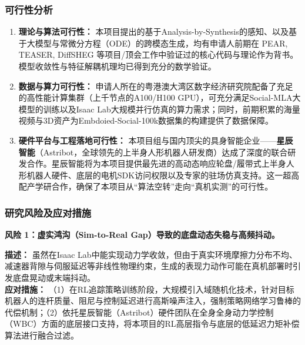 \subsubsection{可行性分析}

\begin{enumerate}
  \item \textbf{理论与算法可行性：} 本项目提出的基于Analysis-by-Synthesis的感知、以及基于大模型与常微分方程（ODE）的跨模态生成，均有申请人前期在 PEAR, TEASER, DiffSHEG 等项目/顶会工作中验证过的核心代码与理论作为背书。模型收敛性与特征解耦机理均已得到充分的数学验证。
  \item \textbf{数据与算力可行性：} 申请人所在的粤港澳大湾区数字经济研究院配备了充足的高性能计算集群（上千节点的A100/H100 GPU），可充分满足Social-MLA大模型的训练以及Isaac Lab大规模并行仿真的算力需求；同时，前期积累的海量视频与3D资产为Embdoied-Social-100k数据集的构建提供了数据保障。
  \item \textbf{硬件平台与工程落地可行性：} 本项目组与国内顶尖的具身智能企业——\textbf{星辰智能}（Astribot，全球领先的上半身人形机器人研发商）达成了深度的联合研发合作。星辰智能将为本项目提供最先进的高动态响应轮盘/履带式上半身人形机器人硬件、底层的电机SDK访问权限以及专家的驻场仿真支持。这一超高配产学研合作，确保了本项目从“算法空转”走向“真机实测”的可行性。
\end{enumerate}

\subsubsection{研究风险及应对措施}

{\textbf{风险 1：虚实鸿沟（Sim-to-Real Gap）导致的底盘动态失稳与高频抖动。}}

\textbf{描述：} 虽然在Isaac Lab中能实现动力学收敛，但由于真实环境摩擦力分布不均、减速器背隙与伺服延迟等非线性物理约束，生成的表现力动作可能在真机部署时引发底盘晃动或末端抖动。\\
\textbf{应对措施：} （1）在RL追踪策略训练阶段，大规模引入域随机化技术，针对目标机器人的连杆质量、阻尼与控制延迟进行高斯噪声注入，强制策略网络学习鲁棒的代偿机制；（2）依托星辰智能（Astribot）硬件团队在全身全身动力学控制（WBC）方面的底层接口支持，将本项目的RL高层指令与底层的低延迟力矩补偿算法进行融合过滤。

